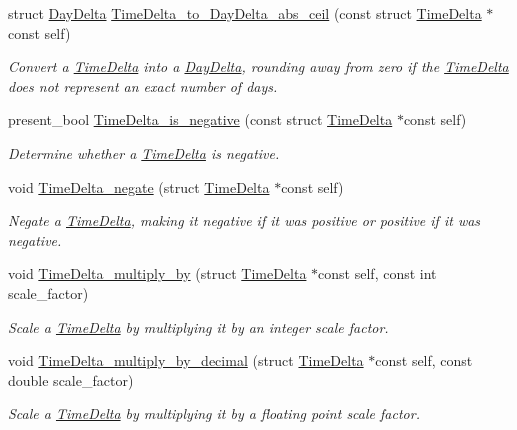 \begin{DoxyCompactItemize}
struct \hyperlink{structDayDelta}{\-Day\-Delta} \hyperlink{time-delta_8h_ae1a3f58fc84a366415dc6cde308b27ee}{\-Time\-Delta\-\_\-to\-\_\-\-Day\-Delta\-\_\-abs\-\_\-ceil} (const struct \hyperlink{structTimeDelta}{\-Time\-Delta} $\ast$const self)
\begin{DoxyCompactList}\small\item\em \-Convert a \hyperlink{structTimeDelta}{\-Time\-Delta} into a \hyperlink{structDayDelta}{\-Day\-Delta}, rounding away from zero if the \hyperlink{structTimeDelta}{\-Time\-Delta} does not represent an exact number of days. \end{DoxyCompactList}\item 
present\-\_\-bool \hyperlink{time-delta_8h_a4fc42a10abf8771117d2f9ced4f11bf2}{\-Time\-Delta\-\_\-is\-\_\-negative} (const struct \hyperlink{structTimeDelta}{\-Time\-Delta} $\ast$const self)
\begin{DoxyCompactList}\small\item\em \-Determine whether a \hyperlink{structTimeDelta}{\-Time\-Delta} is negative. \end{DoxyCompactList}\item 
void \hyperlink{time-delta_8h_a906aa66074e2d9ef675ea2d2a1d25084}{\-Time\-Delta\-\_\-negate} (struct \hyperlink{structTimeDelta}{\-Time\-Delta} $\ast$const self)
\begin{DoxyCompactList}\small\item\em \-Negate a \hyperlink{structTimeDelta}{\-Time\-Delta}, making it negative if it was positive or positive if it was negative. \end{DoxyCompactList}\item 
void \hyperlink{time-delta_8h_a772db85da3c67f149da8877ac8d04fad}{\-Time\-Delta\-\_\-multiply\-\_\-by} (struct \hyperlink{structTimeDelta}{\-Time\-Delta} $\ast$const self, const int scale\-\_\-factor)
\begin{DoxyCompactList}\small\item\em \-Scale a \hyperlink{structTimeDelta}{\-Time\-Delta} by multiplying it by an integer scale factor. \end{DoxyCompactList}\item 
void \hyperlink{time-delta_8h_a561fba60f8ba4648928fec8e18069ebb}{\-Time\-Delta\-\_\-multiply\-\_\-by\-\_\-decimal} (struct \hyperlink{structTimeDelta}{\-Time\-Delta} $\ast$const self, const double scale\-\_\-factor)
\begin{DoxyCompactList}\small\item\em \-Scale a \hyperlink{structTimeDelta}{\-Time\-Delta} by multiplying it by a floating point scale factor. \end{DoxyCompactList}\item 

\end{DoxyCompactItemize}
